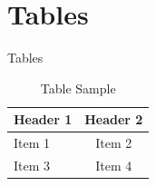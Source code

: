 \documentclass[aspectratio=43]{beamer}
\begin{document}
\section{Tables}
\begin{frame}{Tables}
  \begin{table}
    \centering
    \begin{tabular}{l|c}
    Header 1 & Header 2 \\
    \hline
    Item 1 & Item 2 \\
    Item 3 & Item 4 \\
    \end{tabular}
    \caption{Table Sample}
  \end{table}
\end{frame}
\end{document}
